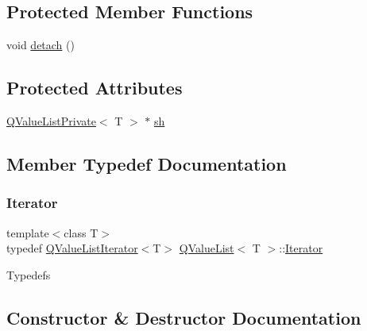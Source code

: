 \subsection*{Protected Member Functions}
\begin{DoxyCompactItemize}
\item 
void \mbox{\hyperlink{class_q_value_list_a8058c18bd44bd75b72947e2db636689b}{detach}} ()
\end{DoxyCompactItemize}
\subsection*{Protected Attributes}
\begin{DoxyCompactItemize}
\item 
\mbox{\hyperlink{class_q_value_list_private}{Q\+Value\+List\+Private}}$<$ T $>$ $\ast$ \mbox{\hyperlink{class_q_value_list_a98d0ae49f314645c094e61a1d2c1264c}{sh}}
\end{DoxyCompactItemize}


\subsection{Member Typedef Documentation}
\mbox{\label{class_q_value_list_a043c8661906b45f062d493601804a5ea}} 
\subsubsection{\texorpdfstring{Iterator}{Iterator}}
{\footnotesize\ttfamily template$<$class T$>$ \\
typedef \mbox{\hyperlink{class_q_value_list_iterator}{Q\+Value\+List\+Iterator}}$<$T$>$ \mbox{\hyperlink{class_q_value_list}{Q\+Value\+List}}$<$ T $>$\+::\mbox{\hyperlink{class_q_value_list_a043c8661906b45f062d493601804a5ea}{Iterator}}}

Typedefs 

\subsection{Constructor \& Destructor Documentation}
\mbox{\label{class_q_value_list_ab510376a550afa49444ef73aa64bd057}} 
